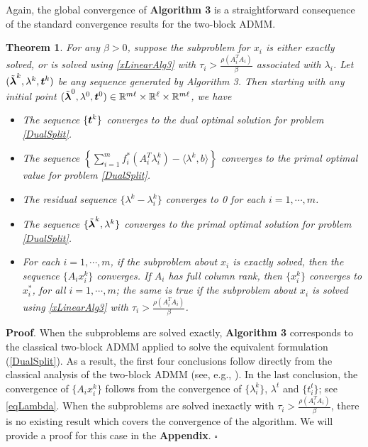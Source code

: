 \documentclass{mcom-l}
\newtheorem{theorem}{Theorem}[section]
\theoremstyle{definition}
\theoremstyle{remark}
\numberwithin{equation}{section}
\begin{document}
{Again, the global convergence of {\bf{Algorithm 3}} is a straightforward consequence of the standard convergence results for the
two-block ADMM.
\begin{theorem}\label{Algorithm2Convergence}
For any $\beta >0$, suppose the subproblem for $x_i$ is either exactly solved, or is solved using \eqref{xLinearAlg3} with $\tau_i > \frac{\rho (A_i^T A_i)}{\beta}$ associated with $\lambda_i$. Let $(\tilde{\mbox{\boldmath$\lambda$}}^k, \lambda^k, \mbox{\boldmath$t$}^k )$ be any sequence generated by Algorithm 3. Then starting with any initial point $(\tilde{\mbox{\boldmath$\lambda$}}^0, \lambda^0, \mbox{\boldmath$t$}^0 )\in \mathbb{R}^{m\ell}\times \mathbb{R}^{\ell}\times \mathbb{R}^{m\ell}$, we have
\begin{itemize}
\item[1.] The sequence $\{\mbox{\boldmath$t$}^k\}$ converges to  the dual optimal solution for
problem \eqref{DualSplit}.
\item[2.] The sequence $\left\{\sum\limits_{i=1}^m f_i^* (A_i^T \lambda_i^k) - \langle \lambda^k, b \rangle\right\}$ converges to the primal optimal value for problem
\eqref{DualSplit}.
\item[3.] The residual sequence $\{\lambda^k - \lambda_i^k\}$ converges to 0 for each $i=1,\cdots,m$.
\item[4.] The sequence $\{\tilde{\mbox{\boldmath$\lambda$}}^k, \lambda^k\}$ converges to the primal optimal solution for problem \eqref{DualSplit}.
\item[5.] For each $i=1,\cdots,m$, if the subproblem about $x_i$ is exactly solved, then the sequence $\{A_i x_i^k\}$ converges. If $A_i$ has full column rank, then $\{ x_i^k \}$ converges to $x_i^*$, for all $i=1,\cdots,m$; the same is true if the subproblem about $x_i$ is solved using \eqref{xLinearAlg3} with $\tau_i > \frac{\rho (A_i^T A_i)}{\beta}$.
\end{itemize}
\end{theorem}
{\bf{Proof}}. When the subproblems are solved exactly, {\bf Algorithm 3} corresponds to the classical two-block ADMM applied to solve the equivalent formulation (\ref{DualSplit}). As a result, the first four conclusions follow directly from the classical analysis of the two-block ADMM (see, e.g., \cite[Section 3.2]{BoydADMMsurvey2011}). In the last conclusion, the convergence of $\{ A_i x_i^k \}$ follows from the convergence of $\{\lambda^k_i\}$, $\lambda^t$ and $\{t^t_i\}$; see \eqref{eqLambda}. When the subproblems are solved inexactly  with $\tau_i > \frac{\rho (A_i^T A_i)}{\beta}$, there is no existing result which covers the convergence of the algorithm. We will provide a  proof for this case in the {\bf{Appendix}}. \hfill$\square$

}
\end{document}
